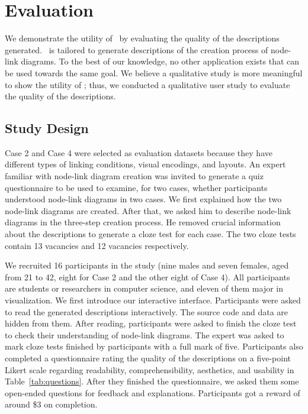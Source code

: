 \section{Evaluation}
We demonstrate the utility of \ApproachName~by evaluating the quality of the descriptions generated.
\ApproachName~is tailored to generate descriptions of the creation process of node-link diagrams.
To the best of our knowledge, no other application exists that can be used towards the same goal.
We believe a qualitative study is more meaningful to show the utility of \ApproachName;
thus, we conducted a qualitative user study to evaluate the quality of the descriptions.

\subsection{Study Design}
Case 2 and Case 4 were selected as evaluation datasets
because they have different types of linking conditions, visual encodings, and layouts.
An expert familiar with node-link diagram creation was invited to generate a quiz questionnaire to be used to examine, for two cases, whether participants understood node-link diagrams in two cases.
We first explained how the two node-link diagrams are created.
After that, we asked him to describe node-link diagrams in the three-step creation process.
He removed crucial information about the descriptions to generate a cloze test for each case.
The two cloze tests contain 13 vacancies and 12 vacancies respectively.

We recruited 16 participants in the study (nine males and seven females, aged from 21 to 42, eight for Case 2 and the other eight of Case 4).
All participants are students or researchers in computer science, and eleven of them major in visualization.
We first introduce our interactive interface.
Participants were asked to read the generated descriptions interactively.
The source code and data are hidden from them.
After reading, participants were asked to finish the cloze test to check their understanding of node-link diagrams.
The expert was asked to mark cloze tests finished by participants with a full mark of five.
Participants also completed a questionnaire rating the quality of the descriptions on a five-point Likert scale regarding readability, comprehensibility, aesthetics, and usability in Table~\ref{tab:questions}.
After they finished the questionnaire, we asked them some open-ended questions for feedback and explanations.
Participants got a reward of around \$3 on completion.

